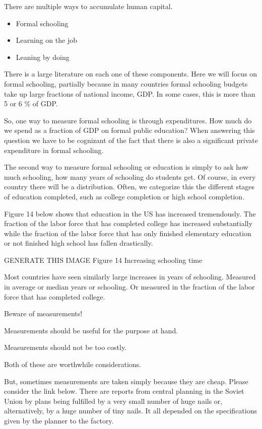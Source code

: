 \documentclass[
]{book}
\providecommand{\tightlist}{%
  \setlength{\itemsep}{0pt}\setlength{\parskip}{0pt}}
\begin{document}
There are multiple ways to accumulate human capital.

\begin{itemize}
\tightlist
\item
  Formal schooling
\item
  Learning on the job
\item
  Leaning by doing
\end{itemize}

There is a large literature on each one of these components. Here we will focus on formal schooling, partially because in many countries formal schooling budgets take up large fractions of national income, GDP. In some cases, this is more than 5 or 6 \% of GDP.

So, one way to measure formal schooling is through expenditures. How much do we spend as a fraction of GDP on formal public education? When answering this question we have to be cognizant of the fact that there is also a significant private expenditure in formal schooling.

The second way to measure formal schooling or education is simply to ask how much schooling, how many years of schooling do students get. Of course, in every country there will be a distribution. Often, we categorize this the different stages of education completed, such as college completion or high school completion.

Figure 14 below shows that education in the US has increased tremendously. The fraction of the labor force that has completed college has increased substantially while the fraction of the labor force that has only finished elementary education or not finished high school has fallen drastically.

GENERATE THIS IMAGE
Figure 14 Increasing schooling time

Most countries have seen similarly large increases in years of schooling. Measured in average or median years or schooling. Or measured in the fraction of the labor force that has completed college.

Beware of measurements!

Measurements should be useful for the purpose at hand.

Measurements should not be too costly.

Both of these are worthwhile considerations.

But, sometimes measurements are taken simply because they are cheap. Please consider the link below. There are reports from central planning in the Soviet Union by plans being fulfilled by a very small number of huge nails or, alternatively, by a huge number of tiny nails. It all depended on the specifications given by the planner to the factory.
\end{document}
